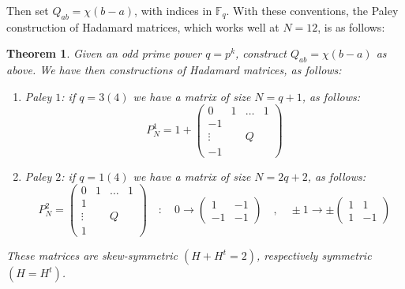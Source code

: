 \documentclass[12pt]{amsbook}
\newtheorem{theorem}{Theorem}[chapter]
\begin{document}
Then set $Q_{ab}=\chi(b-a)$, with indices in $\mathbb F_q$. With these conventions, the Paley construction of Hadamard matrices, which works well at $N=12$, is as follows:

\begin{theorem}
Given an odd prime power $q=p^k$, construct $Q_{ab}=\chi(b-a)$ as above. We have then constructions of Hadamard matrices, as follows:
\begin{enumerate}
\item Paley $1$: if $q=3(4)$ we have a matrix of size $N=q+1$, as follows:
$$P_N^1=1+\begin{pmatrix}
0&1&\ldots&1\\
-1\\
\vdots&&Q\\
-1
\end{pmatrix}$$

\item Paley $2$: if $q=1(4)$ we have a matrix of size $N=2q+2$, as follows:
$$P_N^2=\begin{pmatrix}
0&1&\ldots&1\\
1\\
\vdots&&Q\\
1
\end{pmatrix}\quad:\quad 0\to\begin{pmatrix}1&-1\\ -1&-1\end{pmatrix}\quad,\quad\pm1\to\pm\begin{pmatrix}1&1\\1&-1\end{pmatrix}$$
\end{enumerate}
These matrices are skew-symmetric $(H+H^t=2)$, respectively symmetric $(H=H^t)$.
\end{theorem}
\end{document}
